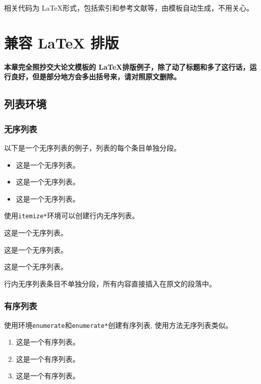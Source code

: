 \documentclass[doctor,openright,twoside]{sjtuthesis}
\theoremstyle{plain}
\theoremstyle{definition}
\theoremstyle{remark}
\theoremstyle{ocrenumbox}
\theoremstyle{plain}
\begin{document}
相关代码为 \LaTeX 形式，包括索引和参考文献等，由模板自动生成，不用关心。

\chapter{兼容 {\LaTeX} 排版}
\label{chap:latex}

\textbf{本章完全照抄交大论文模板的 \LaTeX 排版例子，除了动了标题和多了这行话，运行良好，但是部分地方会多出括号来，请对照原文删除。}

\section{列表环境}
\label{sec:list}

\subsection{无序列表}
\label{sec:unorderlist}

以下是一个无序列表的例子，列表的每个条目单独分段。

\begin{itemize}
  \item 这是一个无序列表。
  \item 这是一个无序列表。
  \item 这是一个无序列表。
\end{itemize}

使用\verb+itemize*+环境可以创建行内无序列表。

\begin{itemize*}
  \item 这是一个无序列表。
  \item 这是一个无序列表。
  \item 这是一个无序列表。
\end{itemize*}

行内无序列表条目不单独分段，所有内容直接插入在原文的段落中。

\subsection{有序列表}
\label{sec:orderlist}

使用环境\verb+enumerate+和\verb+enumerate*+创建有序列表,
使用方法无序列表类似。

\begin{enumerate}
  \item 这是一个有序列表。
  \item 这是一个有序列表。
  \item 这是一个有序列表。
\end{enumerate}
\end{document}
